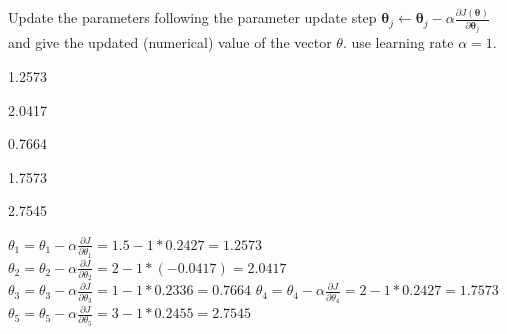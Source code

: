 \documentclass[11pt,addpoints,answers]{exam}
\newcommand{\thetav     }{\boldsymbol \theta     }
\begin{document}
\begin{questions}
    
    \clearpage
    
    \question[1] Update the parameters following the parameter update step $\thetav_j \leftarrow \thetav_j - \alpha \frac{\partial J(\thetav)}{\partial \thetav_j}$ and give the updated (numerical) value of the vector $\theta$. use learning rate $\alpha = 1$.

    \begin{your_solution}[title=$\theta_1$,height=1.8cm,width=3cm]
    1.2573
    \end{your_solution}
    \begin{your_solution}[title=$\theta_2$,height=1.8cm,width=3cm]
    2.0417
    \end{your_solution}
    \begin{your_solution}[title=$\theta_3$,height=1.8cm,width=3cm]
    0.7664
    \end{your_solution}
    \begin{your_solution}[title=$\theta_4$,height=1.8cm,width=3cm]
    1.7573
    \end{your_solution}
    \begin{your_solution}[title=$\theta_5$,height=1.8cm,width=3cm]
    2.7545
    \end{your_solution}
    
    \begin{your_solution}[title=Work, height=6cm,width=15.3cm]
   	$\theta_1 = \theta_1 - \alpha\frac{\partial J}{\partial \theta_1} = 1.5 - 1 * 0.2427 = 1.2573$\newline\newline
   	$\theta_2 = \theta_2 - \alpha\frac{\partial J}{\partial \theta_2} = 2 - 1 * (-0.0417) = 2.0417$\newline\newline
   	$\theta_3 = \theta_3 - \alpha\frac{\partial J}{\partial \theta_3} = 1 - 1 * 0.2336 = 0.7664$\newline\newline
   	$\theta_4 = \theta_4 - \alpha\frac{\partial J}{\partial \theta_4} = 2 - 1 * 0.2427 = 1.7573$\newline\newline
   	$\theta_5 = \theta_5 - \alpha\frac{\partial J}{\partial \theta_5} = 3 - 1 * 0.2455 = 2.7545$\newline\newline
    \end{your_solution}
    
    \clearpage
    
    


 \clearpage
 
 \end{questions}
 
\end{document}
